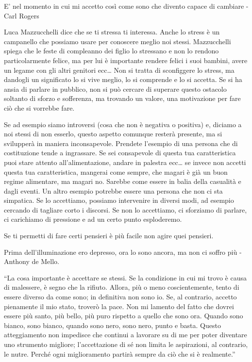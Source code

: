 \documentclass[12pt]{book} %
\begin{document}
E' nel momento in cui mi accetto così come sono che divento capace di cambiare - Carl Rogers

Luca Mazzucchelli dice che se ti stressa ti interessa. Anche lo stress è un campanello che possiamo usare per conoscere
meglio noi stessi. Mazzucchelli spiega che le feste di compleanno dei figlio lo stressano e non lo rendono
particolarmente felice, ma per lui è importante rendere felici i suoi bambini, avere un legame con gli altri genitori
ecc… Non si tratta di sconfiggere lo stress, ma dandogli un significato lo si vive meglio, lo si comprende e lo si
accetta. Se si ha ansia di parlare in pubblico, non si può cercare di superare questo ostacolo soltanto di sforzo e
sofferenza, ma trovando un valore, una motivazione per fare ciò che si vorrebbe fare.

Se ad esempio siamo introversi (cosa che non è negativa o positiva) e, diciamo a noi stessi di non esserlo, questo
aspetto comunque resterà presente, ma si svilupperà in maniera inconsapevole. Prendete l'esempio
di una persona che di costituzione tende a ingrassare. Se sei consapevole di questa tua caratteristica puoi stare
attento all'alimentazione, andare in palestra ecc… se invece non accetti questa tua
caratteristica, mangerai come sempre, che magari è già un buon regime alimentare, ma magari no. Sarebbe come essere in
balia della casualità e dagli eventi. Un altro esempio potrebbe essere una persona che non ci sta simpatica.
Se lo accettiamo, possiamo intervenire in diversi modi, ad esempio cercando di tagliare corto i discorsi. Se non lo
accettiamo, ci sforziamo di parlare, ci carichiamo di pressione e ad un certo punto esploderemo.

Se ti permetti di fare certi pensieri è più facile non agire quei pensieri.

Prima dell'illuminazione ero depresso, ora lo sono ancora, ma non ci soffro più - Anthony de Mello.

“La cosa importante è accettare se stessi. Se la condizione in cui mi trovo è causa di malessere, è segno che la
rifiuto. Allora, più o meno coscientemente, tento di essere diverso da come sono; in definitiva non sono io. Se, al
contrario, accetto pienamente il mio stato, troverò la pace. Non mi lamento del fatto che dovrei essere più santo, più
bello, più puro rispetto a quello che sono ora. Quando sono bianco, sono bianco, quando sono nero, sono nero, punto e
basta. Questo atteggiamento non impedisce che continui a lavorare su di me per poter diventare uno strumento migliore;
l'accettazione di sé non limita le aspirazioni, al contrario, le nutre. Perché ogni miglioramento
partirà sempre da ciò che si è realmente.” 
\end{document}
